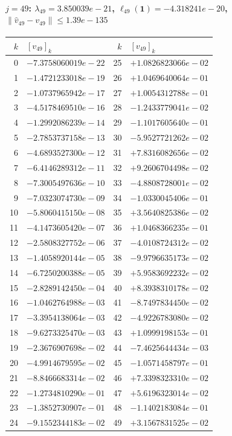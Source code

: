 \documentclass[11pt]{article}
\begin{document}
\paragraph{$j = 49$: $\lambda_{49} = 3.850039e-21$, \quad $\ell_{49}(\mathbf{1}) = -4.318241e-20$, \quad $\|\hat v_{49} - v_{49}\| \leq 1.39e-135$}
\begin{center}
{\footnotesize
\begin{tabular}{r@{\;\;}l@{\quad}r@{\;\;}l}
\toprule
$k$ & $[v_{49}]_k$ & $k$ & $[v_{49}]_k$ \\
\midrule
0 & $-7.3758060019e-22$ & 25 & $+1.0826823066e-02$ \\
1 & $-1.4721233018e-19$ & 26 & $+1.0469640064e-01$ \\
2 & $-1.0737965942e-17$ & 27 & $+1.0054312788e-01$ \\
3 & $-4.5178469510e-16$ & 28 & $-1.2433779041e-02$ \\
4 & $-1.2992086239e-14$ & 29 & $-1.1017605640e-01$ \\
5 & $-2.7853737158e-13$ & 30 & $-5.9527721262e-02$ \\
6 & $-4.6893527300e-12$ & 31 & $+7.8316082656e-02$ \\
7 & $-6.4146289312e-11$ & 32 & $+9.2606704498e-02$ \\
8 & $-7.3005497636e-10$ & 33 & $-4.8808728001e-02$ \\
9 & $-7.0323074730e-09$ & 34 & $-1.0330045406e-01$ \\
10 & $-5.8060415150e-08$ & 35 & $+3.5640825386e-02$ \\
11 & $-4.1473605420e-07$ & 36 & $+1.0468366235e-01$ \\
12 & $-2.5808327752e-06$ & 37 & $-4.0108724312e-02$ \\
13 & $-1.4058920144e-05$ & 38 & $-9.9796635173e-02$ \\
14 & $-6.7250200388e-05$ & 39 & $+5.9583692232e-02$ \\
15 & $-2.8289142450e-04$ & 40 & $+8.3938310178e-02$ \\
16 & $-1.0462764988e-03$ & 41 & $-8.7497834450e-02$ \\
17 & $-3.3954138064e-03$ & 42 & $-4.9226783080e-02$ \\
18 & $-9.6273325470e-03$ & 43 & $+1.0999198153e-01$ \\
19 & $-2.3676907698e-02$ & 44 & $-7.4625644434e-03$ \\
20 & $-4.9914679595e-02$ & 45 & $-1.0571458797e-01$ \\
21 & $-8.8466683314e-02$ & 46 & $+7.3398323310e-02$ \\
22 & $-1.2734810290e-01$ & 47 & $+5.6196323014e-02$ \\
23 & $-1.3852730907e-01$ & 48 & $-1.1402183084e-01$ \\
24 & $-9.1552344183e-02$ & 49 & $+3.1567831525e-02$ \\
\bottomrule
\end{tabular}
}
\end{center}
\end{document}
